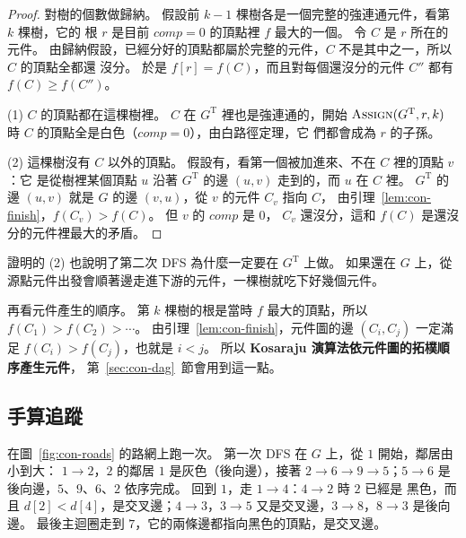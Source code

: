 \begin{proof}
對樹的個數做歸納。 假設前 $k - 1$ 棵樹各是一個完整的強連通元件，看第 $k$ 棵樹，它的
根 $r$ 是目前 $\mathit{comp} = 0$ 的頂點裡 $f$ 最大的一個。 令 $C$ 是 $r$ 所在的元件。
由歸納假設，已經分好的頂點都屬於完整的元件，$C$ 不是其中之一，所以 $C$ 的頂點全都還
沒分。 於是 $f[r] = f(C)$，而且對每個還沒分的元件 $C''$ 都有 $f(C) \ge f(C'')$。

(1) $C$ 的頂點都在這棵樹裡。 $C$ 在 $G^{\mathrm{T}}$ 裡也是強連通的，開始 $\proc{Assign}
(G^{\mathrm{T}}, r, k)$ 時 $C$ 的頂點全是白色（$\mathit{comp} = 0$），由白路徑定理，它
們都會成為 $r$ 的子孫。

(2) 這棵樹沒有 $C$ 以外的頂點。 假設有，看第一個被加進來、不在 $C$ 裡的頂點 $v$：它
是從樹裡某個頂點 $u$ 沿著 $G^{\mathrm{T}}$ 的邊 $(u, v)$ 走到的，而 $u$ 在 $C$ 裡。
$G^{\mathrm{T}}$ 的邊 $(u, v)$ 就是 $G$ 的邊 $(v, u)$，從 $v$ 的元件 $C_v$ 指向 $C$，
由引理~\ref{lem:con-finish}，$f(C_v) > f(C)$。 但 $v$ 的 $\mathit{comp}$ 是 $0$，
$C_v$ 還沒分，這和 $f(C)$ 是還沒分的元件裡最大的矛盾。
\end{proof}

證明的 (2) 也說明了第二次 DFS 為什麼一定要在 $G^{\mathrm{T}}$ 上做。 如果還在 $G$
上，從源點元件出發會順著邊走進下游的元件，一棵樹就吃下好幾個元件。

再看元件產生的順序。 第 $k$ 棵樹的根是當時 $f$ 最大的頂點，所以 $f(C_1) > f(C_2) >
\cdots$。 由引理~\ref{lem:con-finish}，元件圖的邊 $(C_i, C_j)$ 一定滿足 $f(C_i) >
f(C_j)$，也就是 $i < j$。 所以 \textbf{Kosaraju 演算法依元件圖的拓樸順序產生元件}，
第~\ref{sec:con-dag}~節會用到這一點。

\subsection{手算追蹤}

在圖~\ref{fig:con-roads} 的路網上跑一次。 第一次 DFS 在 $G$ 上，從 $1$ 開始，鄰居由小到大：
$1 \to 2$，$2$ 的鄰居 $1$ 是灰色（後向邊），接著 $2 \to 6 \to 9 \to 5$；$5 \to 6$ 是
後向邊，$5$、$9$、$6$、$2$ 依序完成。 回到 $1$，走 $1 \to 4$：$4 \to 2$ 時 $2$ 已經是
黑色，而且 $d[2] < d[4]$，是交叉邊；$4 \to 3$，$3 \to 5$ 又是交叉邊，$3 \to 8$，$8
\to 3$ 是後向邊。 最後主迴圈走到 $7$，它的兩條邊都指向黑色的頂點，是交叉邊。


